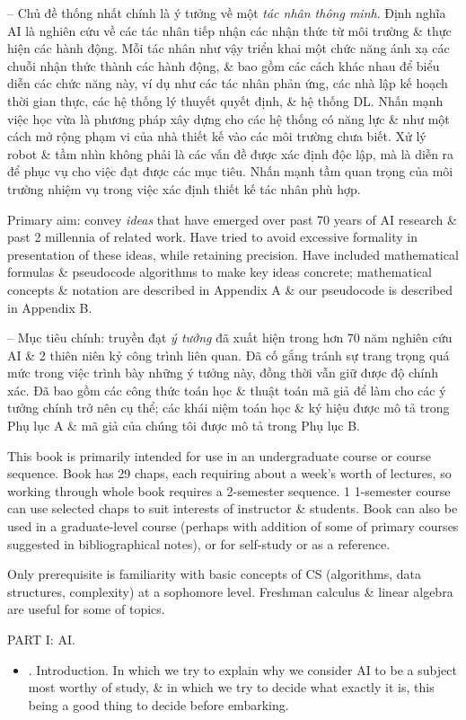 \documentclass{article}
\begin{document}
\begin{itemize}
\begin{itemize}
		-- Chủ đề thống nhất chính là ý tưởng về một {\it tác nhân thông minh}. Định nghĩa AI là nghiên cứu về các tác nhân tiếp nhận các nhận thức từ môi trường \& thực hiện các hành động. Mỗi tác nhân như vậy triển khai một chức năng ánh xạ các chuỗi nhận thức thành các hành động, \& bao gồm các cách khác nhau để biểu diễn các chức năng này, ví dụ như các tác nhân phản ứng, các nhà lập kế hoạch thời gian thực, các hệ thống lý thuyết quyết định, \& hệ thống DL. Nhấn mạnh việc học vừa là phương pháp xây dựng cho các hệ thống có năng lực \& như một cách mở rộng phạm vi của nhà thiết kế vào các môi trường chưa biết. Xử lý robot \& tầm nhìn không phải là các vấn đề được xác định độc lập, mà là diễn ra để phục vụ cho việc đạt được các mục tiêu. Nhấn mạnh tầm quan trọng của môi trường nhiệm vụ trong việc xác định thiết kế tác nhân phù hợp.
		
		Primary aim: convey {\it ideas} that have emerged over past 70 years of AI research \& past 2 millennia of related work. Have tried to avoid excessive formality in presentation of these ideas, while retaining precision. Have included mathematical formulas \& pseudocode algorithms to make key ideas concrete; mathematical concepts \& notation are described in Appendix A \& our pseudocode is described in Appendix B.
		
		-- Mục tiêu chính: truyền đạt {\it ý tưởng} đã xuất hiện trong hơn 70 năm nghiên cứu AI \& 2 thiên niên kỷ công trình liên quan. Đã cố gắng tránh sự trang trọng quá mức trong việc trình bày những ý tưởng này, đồng thời vẫn giữ được độ chính xác. Đã bao gồm các công thức toán học \& thuật toán mã giả để làm cho các ý tưởng chính trở nên cụ thể; các khái niệm toán học \& ký hiệu được mô tả trong Phụ lục A \& mã giả của chúng tôi được mô tả trong Phụ lục B.
		
		This book is primarily intended for use in an undergraduate course or course sequence. Book has 29 chaps, each requiring about a week's worth of lectures, so working through whole book requires a 2-semester sequence. 1 1-semester course can use selected chaps to suit interests of instructor \& students. Book can also be used in a graduate-level course (perhaps with addition of some of primary courses suggested in bibliographical notes), or for self-study or as a reference.
		
		Only prerequisite is familiarity with basic concepts of CS (algorithms, data structures, complexity) at a sophomore level. Freshman calculus \& linear algebra are useful for some of topics.
	\end{itemize}
	PART I: AI.
	\begin{itemize}
		\item {. Introduction.} In which we try to explain why we consider AI to be a subject most worthy of study, \& in which we try to decide what exactly it is, this being a good thing to decide before embarking.
		

\end{itemize}
\end{itemize}
\end{document}
